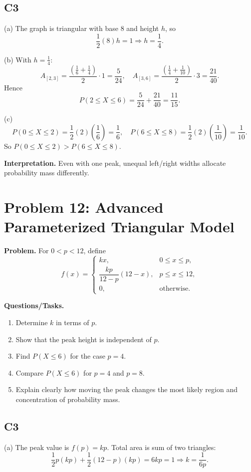 \subsection*{C3}
(a) The graph is triangular with base $8$ and height $h$, so
\[
\frac12(8)h=1\Rightarrow h=\frac14.
\]

(b) With $h=\frac14$:
\[
A_{[2,3]}=\frac{\left(\frac16+\frac14\right)}{2}\cdot1=\frac{5}{24},
\quad
A_{[3,6]}=\frac{\left(\frac14+\frac1{10}\right)}{2}\cdot3=\frac{21}{40}.
\]
Hence
\[
P(2\le X\le 6)=\frac{5}{24}+\frac{21}{40}=\frac{11}{15}.
\]

(c)
\[
P(0\le X\le 2)=\frac12(2)\left(\frac16\right)=\frac16,
\quad
P(6\le X\le 8)=\frac12(2)\left(\frac1{10}\right)=\frac1{10}.
\]
So $P(0\le X\le 2)>P(6\le X\le 8)$.

\textbf{Interpretation.}
Even with one peak, unequal left/right widths allocate probability mass differently.

\section{Problem 12: Advanced Parameterized Triangular Model}

\textbf{Problem.}
For $0<p<12$, define
\[
f(x)=\begin{cases}
kx, & 0\le x\le p,\\
\dfrac{kp}{12-p}(12-x), & p\le x\le 12,\\
0, & \text{otherwise.}
\end{cases}
\]

\textbf{Questions/Tasks.}
\begin{enumerate}
\item Determine $k$ in terms of $p$.
\item Show that the peak height is independent of $p$.
\item Find $P(X\le 6)$ for the case $p=4$.
\item Compare $P(X\le 6)$ for $p=4$ and $p=8$.
\item Explain clearly how moving the peak changes the most likely region and concentration of probability mass.
\end{enumerate}

\subsection*{C3}
(a) The peak value is $f(p)=kp$.
Total area is sum of two triangles:
\[
\frac12 p(kp)+\frac12(12-p)(kp)=6kp=1
\Rightarrow
k=\frac{1}{6p}.
\]

